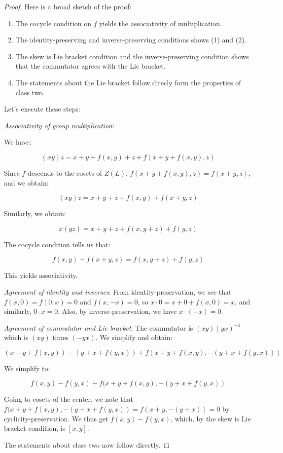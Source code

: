 \documentclass[10pt]{amsart}
\begin{document}
\begin{proof}
  Here is a broad sketch of the proof:
  \begin{enumerate}
  \item The cocycle condition on $f$ yields the associativity of
    multiplication.
  \item The identity-preserving and inverse-preserving conditions shows
    (1) and (2).
  \item The skew is Lie bracket condition and the inverse-preserving
    condition shows that the commutator agrees with the Lie bracket.
  \item The statements about the Lie bracket follow direcly form the
    properties of class two.
  \end{enumerate}

  Let's execute these steps:

  {\em Associativity of group multiplication}:

  We have:

  $$(xy)z = x + y + f(x,y) + z + f(x + y + f(x,y),z)$$

  Since $f$ descends to the cosets of $Z(L)$, $f(x + y + f(x,y),z) =
  f(x + y,z)$, and we obtain:

  $$(xy)z = x + y + z + f(x,y) + f(x + y,z)$$

  Similarly, we obtain:

  $$x(yz) = x + y + z + f(x,y + z) + f(y,z)$$

  The cocycle condition tells us that:

  $$f(x,y) + f(x + y,z) = f(x,y + z) + f(y,z)$$

  This yields associativity.

  {\em Agreement of identity and inverses}: From
  identity-preservation, we see that $f(x,0) = f(0,x) = 0$ and
  $f(x,-x) = 0$, so $x\cdot 0 = x + 0 + f(x,0) = x$, and similarly, $0
  \cdot x = 0$. Also, by inverse-preservation, we have $x \cdot (-x) =
  0$.

  {\em Agreement of commutator and Lie bracket}: The commutator is
  $(xy)(yx)^{-1}$ which is $(xy)$ times $(-yx)$. We simplify and obtain:

  $$(x + y + f(x,y)) - (y + x + f(y,x)) + f(x + y + f(x,y),-(y + x + f(y,x)))$$

  We simplify to:

  $$f(x,y) - f(y,x) + f(x + y + f(x,y),-(y + x + f(y,x))$$

  Going to cosets of the center, we note that $f(x + y + f(x,y),-(y +
  x + f(y,x)) = f(x + y, -(y + x)) = 0$ by cyclicity-preservation. We
  thus get $f(x,y) - f(y,x)$, which, by the skew is Lie bracket
  condition, is $[x,y]$.

  The statements about class two now follow directly.

\end{proof}
\end{document}
